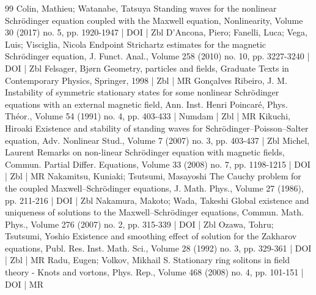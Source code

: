 \documentclass[10pt]{amsart}
\theoremstyle{definition}\newtheorem{defi}[theo]{Definition}\newtheorem{rema}[theo]{Remark}\newtheorem{exam}[theo]{Example}\newtheorem{exem}[theo]{Example}\newtheorem{nota}[theo]{Notation}
\begin{document}
\begin{thebibliography}{99}
Colin, Mathieu; Watanabe, Tatsuya Standing waves for the nonlinear Schrödinger equation coupled with the Maxwell equation, Nonlinearity, Volume 30 (2017) no. 5, pp. 1920-1947 | DOI | Zbl
D’Ancona, Piero; Fanelli, Luca; Vega, Luis; Visciglia, Nicola Endpoint Strichartz estimates for the magnetic Schrödinger equation, J. Funct. Anal., Volume 258 (2010) no. 10, pp. 3227-3240 | DOI | Zbl
Felsager, Bjørn Geometry, particles and fields, Graduate Texts in Contemporary Physics, Springer, 1998 | Zbl | MR
Gonçalves Ribeiro, J. M. Instability of symmetric stationary states for some nonlinear Schrödinger equations with an external magnetic field, Ann. Inst. Henri Poincaré, Phys. Théor., Volume 54 (1991) no. 4, pp. 403-433 | Numdam | Zbl | MR
Kikuchi, Hiroaki Existence and stability of standing waves for Schrödinger–Poisson–Salter equation, Adv. Nonlinear Stud., Volume 7 (2007) no. 3, pp. 403-437 | Zbl
Michel, Laurent Remarks on non-linear Schrödinger equation with magnetic fields, Commun. Partial Differ. Equations, Volume 33 (2008) no. 7, pp. 1198-1215 | DOI | Zbl | MR
Nakamitsu, Kuniaki; Tsutsumi, Masayoshi The Cauchy problem for the coupled Maxwell–Schrödinger equations, J. Math. Phys., Volume 27 (1986), pp. 211-216 | DOI | Zbl
Nakamura, Makoto; Wada, Takeshi Global existence and uniqueness of solutions to the Maxwell–Schrödinger equations, Commun. Math. Phys., Volume 276 (2007) no. 2, pp. 315-339 | DOI | Zbl
Ozawa, Tohru; Tsutsumi, Yoshio Existence and smoothing effect of solution for the Zakharov equations, Publ. Res. Inst. Math. Sci., Volume 28 (1992) no. 3, pp. 329-361 | DOI | Zbl | MR
Radu, Eugen; Volkov, Mikhail S. Stationary ring solitons in field theory - Knots and vortons, Phys. Rep., Volume 468 (2008) no. 4, pp. 101-151 | DOI | MR
\end{thebibliography}
\end{document}

